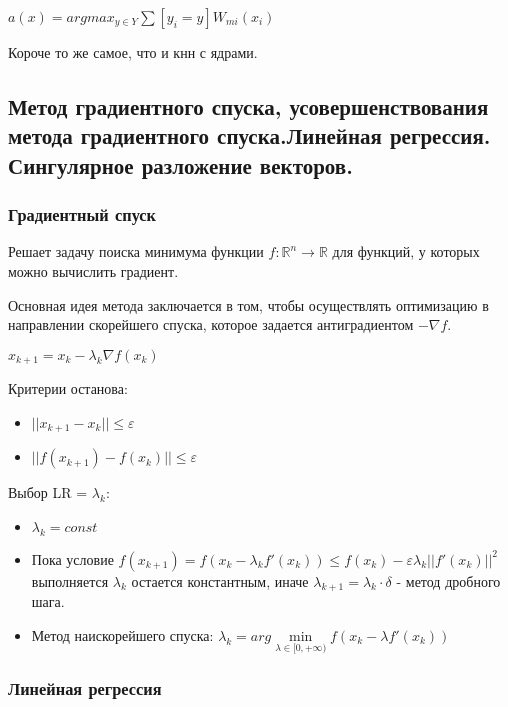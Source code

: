 \documentclass{article}
\begin{document}
$a(x) = argmax_{y \in Y} \sum [y_i = y] W_{mi} (x_i)$

Короче то же самое, что и кнн с ядрами.


\subsection{Метод градиентного спуска, усовершенствования метода градиентного
спуска.Линейная регрессия. Сингулярное разложение векторов.}

\subsubsection{Градиентный спуск}

Решает задачу поиска минимума функции $f: \mathbb{R}^n \to \mathbb{R}$ для
функций, у которых можно вычислить градиент.

Основная идея метода заключается в том, чтобы осуществлять оптимизацию
в направлении скорейшего спуска, которое задается антиградиентом $-\nabla f$.

$x_{k+1} = x_k - \lambda_k \nabla f(x_k)$

Критерии останова:
\begin{itemize}
	\item $||x_{k+1} - x_{k}|| \leq \varepsilon$
	\item $||f(x_{k+1}) - f(x_k)|| \leq \varepsilon$
\end{itemize}

Выбор LR = $\lambda_k$:
\begin{itemize}
	\item $\lambda_k = const$
	\item Пока условие $f(x_{k+1}) = f(x_k - \lambda_k f'(x_k)) \leq
	f(x_k) - \varepsilon\lambda_k ||f'(x_k)||^2$ выполняется $\lambda_k$
	остается константным, иначе $\lambda_{k+1} = \lambda_k \cdot \delta$
	- метод дробного шага.
	\item Метод наискорейшего спуска: $\lambda_k = arg 
	\min\limits_{\lambda \in [0, +\infty)} f(x_k - \lambda f'(x_k))$
\end{itemize}

\subsubsection{Линейная регрессия}

\end{document}
